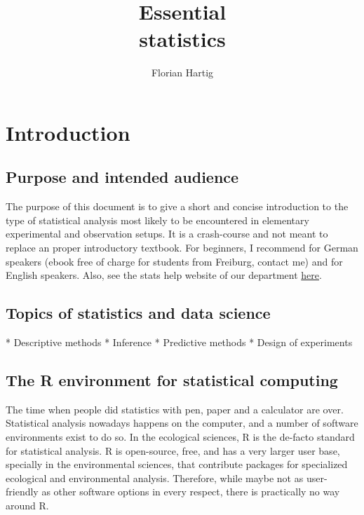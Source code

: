 \documentclass[a4paper,twoside]{tufte-book} %
\title{Essential\\statistics}
\author{Florian Hartig}
\begin{document}


\let\cleardoublepage\clearpage %
\maketitle
\newpage
\tableofcontents

\chapter{Introduction} %

\section{Purpose and intended audience}

The purpose of this document is to give a short and concise introduction to the type of statistical analysis most likely to be encountered in elementary experimental and observation setups. It is a crash-course and not meant to replace an proper introductory textbook. For beginners, I recommend \citep{Dormann-ParametrischeStatistik-2013} for German speakers (ebook free of charge for students from Freiburg, contact me) and \citep{Gotelli-PrimerEcologicalStatistics-2004} for English speakers. Also, see the stats help website of our department \href{http://biometry.github.io/APES/}{here}.


\section{Topics of statistics and data science}

* Descriptive methods
* Inference
* Predictive methods
* Design of experiments


\section{The R environment for statistical computing}

 
The time when people did statistics with pen, paper and a calculator are over. Statistical analysis nowadays happens on the computer, and a number of software environments exist to do so. In the ecological sciences, R is the de-facto standard for statistical analysis. R is open-source, free, and has a very larger user base, specially in the environmental sciences, that contribute packages for specialized ecological and environmental analysis. Therefore, while maybe not as user-friendly as other software options in every respect, there is practically no way around R.
\end{document}
